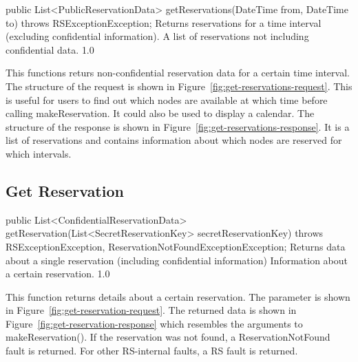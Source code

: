 \documentclass[a4paper,11pt]{article}
\begin{document}
\begin{apidoc}
	{public List<PublicReservationData> getReservations(DateTime from, DateTime to) throws RSExceptionException;} %
	{Returns reservations for a time interval (excluding confidential information).} %
	{
	} %
	{A list of reservations not including confidential data.} %
	{} %
	{1.0} %
\end{apidoc}

This functions returs non-confidential reservation data for a certain time interval. The structure of the request is shown in Figure~\ref{fig:get-reservations-request}. This is useful for users to find out which nodes are available at which time before calling makeReservation. It could also be used to display a calendar. The structure of the response is shown in Figure~\ref{fig:get-reservations-response}. It is a list of reservations and contains information about which nodes are reserved for which intervals. 

	
			\sectionfin
			\subsection{Get Reservation}
	
\begin{apidoc}
	{public List<ConfidentialReservationData> getReservation(List<SecretReservationKey> secretReservationKey) throws RSExceptionException, ReservationNotFoundExceptionException;} %
	{Returns data about a single reservation (including confidential information)} %
	{
	} %
	{Information about a certain reservation.} %
	{} %
	{1.0} %
\end{apidoc}
	
This function returns details about a certain reservation. The parameter is shown in Figure~\ref{fig:get-reservation-request}. The returned data is shown in Figure~\ref{fig:get-reservation-response} which resembles the arguments to makeReservation(). If the reservation was not found, a ReservationNotFound fault is returned.  For other RS-internal faults, a RS fault is returned. 
\end{document}
